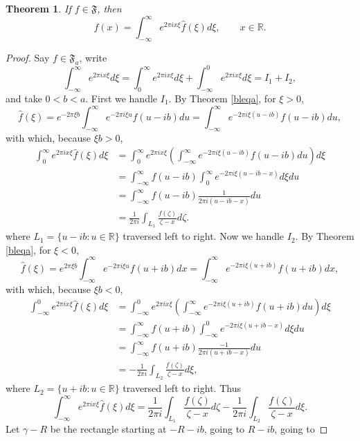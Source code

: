 \documentclass{article}
\newtheorem{theorem}{Theorem}
\theoremstyle{definition}
\begin{document}
\begin{theorem}
If $f \in \mathfrak{F}$, then
\[
f(x) = \int_{-\infty}^\infty e^{2\pi ix\xi} \widehat{f}(\xi) d\xi, \qquad x\in \mathbb{R}.
\]
\end{theorem}
\begin{proof}
Say $f \in \mathfrak{F}_a$, write
\[
\int_{-\infty}^\infty e^{2\pi i x\xi} d\xi = 
\int_{0}^\infty e^{2\pi i x\xi} d\xi+
\int_{-\infty}^0 e^{2\pi i x\xi} d\xi 
 = 
I_1+I_2,
\]
and take $0<b<a$. 
First we handle $I_1$. By Theorem \ref{bleqa}, for $\xi > 0$,
\[
\widehat{f}(\xi) = e^{-2\pi \xi b} \int_{-\infty}^\infty e^{-2\pi i\xi u} f(u-ib) du
=\int_{-\infty}^\infty e^{-2\pi i \xi(u-ib)} f(u-ib) du,
\]
with which, because $\xi b>0$,
\begin{align*}
\int_0^\infty e^{2\pi ix\xi} \widehat{f}(\xi) d\xi&=\int_0^\infty e^{2\pi ix\xi} \left(\int_{-\infty}^\infty e^{-2\pi i \xi(u-ib)} f(u-ib) du\right)
d\xi\\
&= \int_{-\infty}^\infty  f(u-ib) \int_0^\infty e^{-2\pi i\xi(u-ib-x)}  d\xi du\\
&=\int_{-\infty}^\infty  f(u-ib) \frac{1}{2\pi i(u-ib-x)} du\\
&=\frac{1}{2\pi i} \int_{L_1} \frac{f(\zeta)}{\zeta-x} d\zeta.
\end{align*}
where $L_1=\{u-ib: u \in \mathbb{R}\}$ traversed left to right. 
Now we handle $I_2$. By Theorem \ref{bleqa}, for $\xi < 0$,
\[
\widehat{f}(\xi)=e^{2\pi \xi b} \int_{-\infty}^\infty e^{-2\pi i \xi u} f(u+i  b) dx
=\int_{-\infty}^\infty e^{-2\pi i\xi(u+ib)} f(u+ib) dx,
\]
with which, because $\xi b<0$,
\begin{align*}
\int_{-\infty}^0 e^{2\pi ix \xi} \widehat{f}(\xi) d\xi&=\int_{-\infty}^0 e^{2\pi ix\xi} 
\left(\int_{-\infty}^\infty e^{-2\pi i\xi(u+ib)} f(u+ib) du \right) d\xi\\
&=\int_{-\infty}^\infty f(u+ib)  \int_{-\infty}^0 e^{-2\pi i\xi(u+ib-x)} d\xi du\\
&=\int_{-\infty}^\infty f(u+ib) \frac{-1}{2\pi i(u+ib-x)} du\\
&=-\frac{1}{2\pi i} \int_{L_2} \frac{f(\zeta)}{\zeta-x} d\xi,
\end{align*}
where $L_2=\{u+ib: u \in \mathbb{R}\}$ traversed left to right. Thus
\begin{equation}
\int_{-\infty}^\infty e^{2\pi ix \xi} \widehat{f}(\xi) d\xi = \frac{1}{2\pi i} \int_{L_1} \frac{f(\zeta)}{\zeta-x} d\zeta
-\frac{1}{2\pi i} \int_{L_2} \frac{f(\zeta)}{\zeta-x} d\xi.
\label{L1L2}
\end{equation}
Let $\gamma-R$ be the rectangle starting at $-R-ib$, going to $R-ib$, going to

\end{proof}
\end{document}
